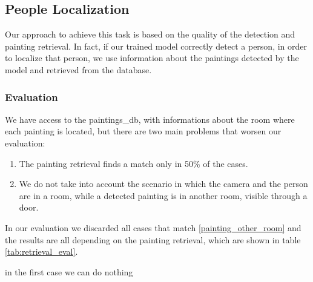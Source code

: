 \subsection{People Localization}
Our approach to achieve this task is based on the quality of the detection and painting retrieval. In fact, if our trained model correctly detect a person, in order to localize that person, we use information about the paintings detected by the model and retrieved from the database.

\subsubsection{Evaluation}
We have access to the paintings\_db, with informations about the room where each painting is located, but there are two main problems that worsen our evaluation:

\begin{enumerate}[label=\alph*)]
    \item \label{retrieval_case} The painting retrieval finds a match only in 50\% of the cases.
    \item \label{painting_other_room} We do not take into account the scenario in which the camera and the person are in a room, while a detected painting is in another room, visible through a door.
\end{enumerate}

In our evaluation we discarded all cases that match \ref*{painting_other_room} and the results are all depending on the painting retrieval, which are shown in table \ref*{tab:retrieval_eval}.

in the first case we can do nothing
